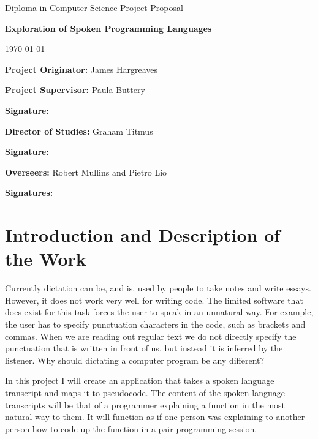 \documentclass[12pt]{article}
\begin{document}
\thispagestyle{empty}

\medskip
{}
\medskip
{}

\vfil

\centerline{\large Diploma in Computer Science Project Proposal}
\vspace{0.4in}
\centerline{\Large\bf Exploration of Spoken Programming Languages}
\vspace{0.3in}
\centerline{\today}

\vfil

{\bf Project Originator:} James Hargreaves

\vspace{0.1in}

{\bf Project Supervisor:} Paula Buttery

\vspace{0.2in}

{\bf Signature:}

\vspace{0.5in}

{\bf Director of Studies:}  Graham Titmus

\vspace{0.2in}

{\bf Signature:}

\vspace{0.5in}

{\bf Overseers:} Robert Mullins and Pietro Lio

\vspace{0.2in}

{\bf Signatures:} 

\vfil
\eject

\section*{Introduction and Description of the Work}
Currently dictation can be, and is, used by people to take notes and write essays. However, it does not work very well for writing code. 
The limited software that does exist for this task forces the user to speak in an unnatural way. For example, the user has to specify 
punctuation characters in the code, such as brackets and commas. When we are reading out regular text we do not directly specify the punctuation
that is written in front of us, but instead it is inferred by the listener. Why should dictating a computer program be any different?\par

In this project I will create an application that takes a spoken language transcript and maps it to pseudocode. The content of the spoken 
language transcripts will be that of a programmer explaining a function in the most natural way to them. It will function as if one person 
was explaining to another person how to code up the function in a pair programming session.\par
\end{document}
